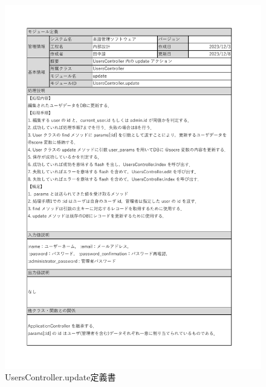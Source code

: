 \begin{figure}
    \centering
    \includegraphics[scale=0.7]{img/Users/xlsx/UsersController_update.pdf}
    \vspace{-1cm}
    \caption{UsersController.update定義書}
\end{figure}
